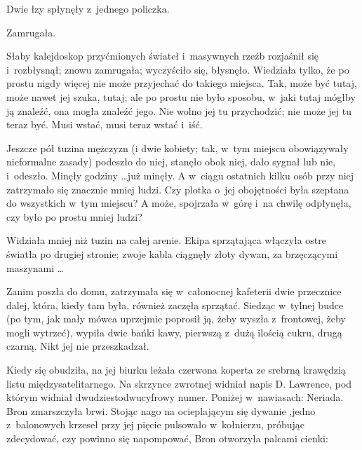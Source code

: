 \documentclass[oneside,polish,11pt,rmheadings]{mwbk}
\begin{document}
Dwie łzy spłynęły z~jednego policzka. 

Zamrugała. 

Słaby kalejdoskop przyćmionych świateł i~masywnych rzeźb rozjaśnił się i~rozbłysnął; znowu zamrugała; wyczyściło się, błysnęło. Wiedziała tylko, że po prostu nigdy więcej nie może przyjechać do takiego miejsca. Tak, może być tutaj, może nawet jej szuka, tutaj; ale po prostu nie było sposobu, w~jaki tutaj mógłby ją znaleźć, ona mogła znaleźć jego. Nie wolno jej tu przychodzić; nie może jej tu teraz być. Musi wstać, musi teraz wstać i~iść. 

Jeszcze pół tuzina mężczyzn (i dwie kobiety; tak, w~tym miejscu obowiązywały nieformalne zasady) podeszło do niej, stanęło obok niej, dało sygnał lub nie, i~odeszło. Minęły godziny \ldots  już minęły. A w~ciągu ostatnich kilku osób przy niej zatrzymało się znacznie mniej ludzi. Czy plotka o~jej obojętności była szeptana do wszystkich w~tym miejscu? A może, spojrzała w~górę i~na chwilę odpłynęła, czy było po prostu mniej ludzi? 

Widziała mniej niż tuzin na całej arenie. Ekipa sprzątająca włączyła ostre światła po drugiej stronie; zwoje kabla ciągnęły złoty dywan, za brzęczącymi maszynami \ldots  

Zanim poszła do domu, zatrzymała się w~całonocnej kafeterii dwie przecznice dalej, która, kiedy tam była, również zaczęła sprzątać. Siedząc w~tylnej budce (po tym, jak mały mówca uprzejmie poprosił ją, żeby wyszła z~frontowej, żeby mogli wytrzeć), wypiła dwie bańki kawy, pierwszą z~dużą ilością cukru, drugą czarną. Nikt jej nie przeszkadzał. 

Kiedy się obudziła, na jej biurku leżała czerwona koperta ze srebrną krawędzią listu międzysatelitarnego. Na skrzynce zwrotnej widniał napis D.  Lawrence, pod którym widniał dwudziestodwucyfrowy numer. Poniżej w~nawiasach: Neriada. Bron zmarszczyła brwi. Stojąc nago na ocieplającym się dywanie ,jedno z~balonowych krzeseł przy jej pięcie pulsowało w~kołnierzu, próbując zdecydować, czy powinno się napompować, Bron otworzyła palcami cienki: 
\end{document}
